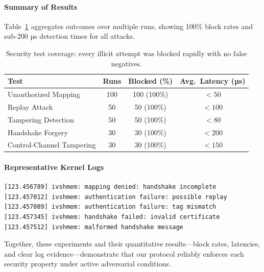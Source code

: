 \documentclass[conference]{IEEEtran}
\begin{document}
\paragraph{Summary of Results}  
Table~\ref{tab:sec_results} aggregates outcomes over multiple runs, showing 100\% block rates and sub-200 µs detection times for all attacks.  

\begin{table}[!h]
  \centering
  \small
  \begin{tabular}{l c c c}
    \toprule
    \textbf{Test}                     & \textbf{Runs} & \textbf{Blocked (\%)} & \textbf{Avg.\ Latency (µs)} \\
    \midrule
    Unauthorized Mapping              & 100           & 100 (100\%)           & $<50$   \\
    Replay Attack                     &  50           &  50 (100\%)           & $<100$  \\
    Tampering Detection               &  50           &  50 (100\%)           & $<80$   \\
    Handshake Forgery                 &  30           &  30 (100\%)           & $<200$  \\
    Control‐Channel Tampering         &  30           &  30 (100\%)           & $<150$  \\
    \bottomrule
  \end{tabular}
  \caption{Security test coverage: every illicit attempt was blocked rapidly with no false negatives.}
  \label{tab:sec_results}
\end{table}

\paragraph{Representative Kernel Logs}  
\begin{verbatim}
[123.456789] ivshmem: mapping denied: handshake incomplete
[123.457012] ivshmem: authentication failure: possible replay
[123.457089] ivshmem: authentication failure: tag mismatch
[123.457345] ivshmem: handshake failed: invalid certificate
[123.457512] ivshmem: malformed handshake message
\end{verbatim}

Together, these experiments and their quantitative results—block rates, latencies, and clear log evidence—demonstrate that our protocol reliably enforces each security property under active adversarial conditions.



\end{document}
